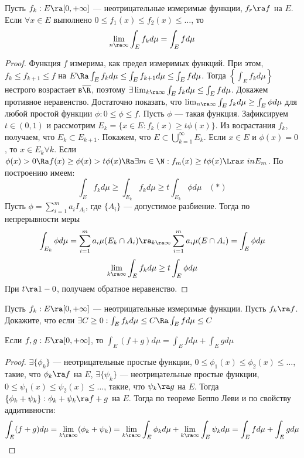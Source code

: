 \begin{theorem}
    Пусть \(f_k: E \ra [0, +\infty]\) --- неотрицательные измеримые функции, \(f_r \ra f\) на \(E\). Если \(\forall x \in E\) выполнено \(0 \le f_1(x) \le f_2(x) \le \dots\), то 
    \[\lim_{n \ra \infty} \int_E f_k d \mu = \int_E f d \mu\]
\end{theorem}
\begin{proof}
    Функция \(f\) измерима, как предел измеримых функций. При этом, \(f_k \le f_{k + 1} \le f\) на \(E \Ra \int_E f_k d \mu \le \int_E f_{k + 1} d \mu \le \int_E f d \mu\). Тогда \(\left\{\int_E f_k d \mu\right\}\) нестрого возрастает в\(\overline{\R}\), поэтому \(\exists \lim_{k \ra \infty} \int_E f_k d \mu \le \int_E f d \mu\). Докажем противное неравенство. Достаточно показать, что \(\lim_{n \ra \infty} \int_E f_k d \mu \ge \int_E \phi d \mu\) для любой простой функции \(\phi: 0 \le \phi \le f\). Пусть \(\phi\) --- такая функция. Зафиксируем \(t \in (0, 1)\) и рассмотрим \(E_k = \{x \in E : f_k(x) \ge t \phi(x)\}\). Из восрастания \(f_k\), получаем, что \(E_k \subset E_{k + 1}\). Покажем, что \(E \subset \bigcup_{k = 1}^\infty E_k\). Если \(x \in E\) и \(\phi(x) = 0\), то \(x \in E_k \forall k\). Если \(\phi(x) > 0 \Ra f(x) \ge \phi(x) > t \phi(x) \Ra \exists m \in \N: f_m(x) \ge t \phi(x) \Lra x\ in E_m\). По построению имеем:
    \[\int_E f_k d \mu \ge \int_{E_k} f_k d \mu \ge t \int_{E_k} \phi d \mu \;\;\;(*)\]
    Пусть \(\phi = \sum_{i = 1}^m a_i I_{A_i}\), где \(\{A_i\}\) --- допустимое разбиение. Тогда по непрерывности меры
    \[\int_{E_k} \phi d \mu = \sum_{i = 1}^m a_i \mu(E_k \cap A_i) \ra_{k \ra \infty} \sum_{i = 1}^m a_i \mu(E \cap A_i) = \int_E \phi d \mu\]
    \[\lim_{k \ra \infty} \int_E f_k d \mu \ge t \int_E \phi d \mu\]
    При \(t \ra 1 - 0\), получаем обратное неравенство.
\end{proof}

\begin{problem}
    Пусть \(f_k: E \ra [0, +\infty]\) --- неотрицательные измеримые функции. Пусть \(f_k \ra f\). Докажите, что если \(\exists C \ge 0: \int_E f_k d \mu \le C \Ra \int_E f d \mu \le C\)
\end{problem}

\begin{proposition}
    Если \(f, g: E \ra [0, +\infty]\), то \(\int_E (f + g) d \mu = \int_E f d \mu + \int_E g d \mu\)
\end{proposition}
\begin{proof}
    \(\exists \{\phi_k\}\) --- неотрицательные простые функции, \(0 \le \phi_1(x) \le \phi_2(x) \le \dots\), такие, что \(\phi_k \ra f\) на \(E\), \(\exists \{\psi_k\}\) --- неотрицательные простые функции, \(0 \le \psi_1(x) \le \psi_2(x) \le \dots\), такие, что \(\psi_k \ra g\) на \(E\). Тогда \(\{\phi_k + \psi_k\}: \phi_k + \psi_k \ra f + g\) на \(E\). Тогда по теореме Беппо Леви и по свойству аддитивности:
    \[\int_E(f + g)d \mu = \lim_{k \ra \infty} (\phi_k + \psi_k) = \lim_{k \ra \infty} \int_E\phi_k d \mu + \lim_{k \ra \infty} \int_E\psi_k d \mu = \int_E f d \mu + \int_E g d \mu\]
\end{proof}

